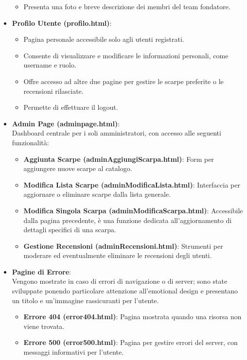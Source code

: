 \documentclass[a4paper, 12pt]{article}
\begin{document}
\begin{justify}
\begin{itemize}
\begin{itemize}
            \item Presenta una foto e breve descrizione dei membri del team fondatore.
        \end{itemize}
    \item \textbf{Profilo Utente (profilo.html)}:
        \begin{itemize}
            \item Pagina personale accessibile solo agli utenti registrati.
            \item Consente di visualizzare e modificare le informazioni personali, come username e ruolo.
            \item Offre accesso ad altre due pagine per gestire le scarpe preferite o le recensioni rilasciate.
            \item Permette di effettuare il logout.
        \end{itemize}
    \item \textbf{Admin Page (adminpage.html)}:\\ 
    Dashboard centrale per i soli amministratori, con accesso alle seguenti funzionalità:
        \begin{itemize}
            \item \textbf{Aggiunta Scarpe (adminAggiungiScarpa.html)}: Form per aggiungere nuove scarpe al catalogo.
            \item \textbf{Modifica Lista Scarpe (adminModificaLista.html)}: Interfaccia per aggiornare o eliminare scarpe dalla lista generale.
            \item \textbf{Modifica Singola Scarpa (adminModificaScarpa.html)}: Accessibile dalla pagina precedente, è una funzione dedicata all'aggiornamento di dettagli specifici di una scarpa.
            \item \textbf{Gestione Recensioni (adminRecensioni.html)}: Strumenti per moderare ed eventualmente eliminare le recensioni degli utenti.
        \end{itemize}
    \item \textbf{Pagine di Errore}:\\
    Vengono mostrate in caso di errori di navigazione o di server; sono state sviluppate ponendo particolare attenzione all'emotional design e presentano un titolo e un'immagine rassicuranti per l'utente.
        \begin{itemize}
            \item \textbf{Errore 404 (error404.html)}: Pagina mostrata quando una risorsa non viene trovata.
            \item \textbf{Errore 500 (error500.html)}: Pagina per gestire errori del server, con messaggi informativi per l'utente.

\end{itemize}
\end{itemize}
\end{justify}
\end{document}
